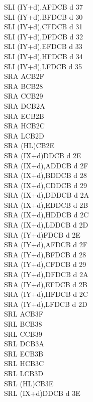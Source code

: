 \begin{multicols}{3}
{\begin{tabbing}
		SLI (IY+d),A\UNDOC\>FDCB d 37\\
		SLI (IY+d),B\UNDOC\>FDCB d 30\\
		SLI (IY+d),C\UNDOC\>FDCB d 31\\
		SLI (IY+d),D\UNDOC\>FDCB d 32\\
		SLI (IY+d),E\UNDOC\>FDCB d 33\\
		SLI (IY+d),H\UNDOC\>FDCB d 34\\
		SLI (IY+d),L\UNDOC\>FDCB d 35\\
		SRA A\>CB2F\\
		SRA B\>CB28\\
		SRA C\>CB29\\
		SRA D\>CB2A\\
		SRA E\>CB2B\\
		SRA H\>CB2C\\
		SRA L\>CB2D\\
		SRA (HL)\>CB2E\\
		SRA (IX+d)\>DDCB d 2E\\
		SRA (IX+d),A\UNDOC\>DDCB d 2F\\
		SRA (IX+d),B\UNDOC\>DDCB d 28\\
		SRA (IX+d),C\UNDOC\>DDCB d 29\\
		SRA (IX+d),D\UNDOC\>DDCB d 2A\\
		SRA (IX+d),E\UNDOC\>DDCB d 2B\\
		SRA (IX+d),H\UNDOC\>DDCB d 2C\\
		SRA (IX+d),L\UNDOC\>DDCB d 2D\\
		SRA (IY+d)\>FDCB d 2E\\
		SRA (IY+d),A\UNDOC\>FDCB d 2F\\
		SRA (IY+d),B\UNDOC\>FDCB d 28\\
		SRA (IY+d),C\UNDOC\>FDCB d 29\\
		SRA (IY+d),D\UNDOC\>FDCB d 2A\\
		SRA (IY+d),E\UNDOC\>FDCB d 2B\\
		SRA (IY+d),H\UNDOC\>FDCB d 2C\\
		SRA (IY+d),L\UNDOC\>FDCB d 2D\\
		SRL A\>CB3F\\
		SRL B\>CB38\\
		SRL C\>CB39\\
		SRL D\>CB3A\\
		SRL E\>CB3B\\
		SRL H\>CB3C\\
		SRL L\>CB3D\\
		SRL (HL)\>CB3E\\
		SRL (IX+d)\>DDCB d 3E\\

\end{tabbing}}
\end{multicols}
